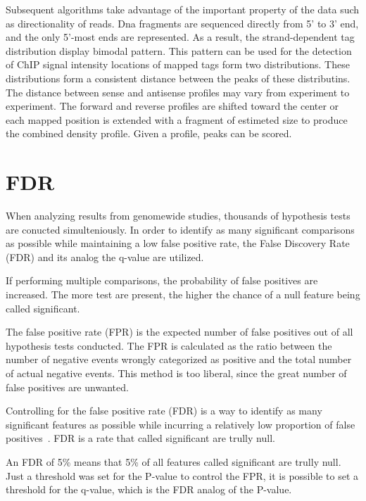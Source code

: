 Subsequent algorithms take advantage of the important property of the data such as directionality of reads.
Dna fragments are sequenced directly from 5' to 3' end, and the only 5'-most ends are represented.
As a result, the strand-dependent tag distribution display bimodal pattern.
This pattern can be used for the detection of ChIP signal intensity locations of mapped tags form two distributions.
These distributions form a consistent distance between the peaks of these distributins.
The distance between sense and antisense profiles may vary from experiment to experiment.
The forward and reverse profiles are shifted toward the center or each mapped position is extended with a fragment of estimeted size to produce the combined density profile.
Given a profile, peaks can be scored.

\section{FDR}

When analyzing results from genomewide studies, thousands of hypothesis tests are conucted simulteniously.
In order to identify as many significant comparisons as possible while maintaining a low false positive rate, the False Discovery Rate (FDR) and its analog the q-value are utilized.

If performing multiple comparisons, the probability of false positives are increased.
The more test are present, the higher the chance of a null feature being called significant.

The false positive rate (FPR) is the expected number of false positives out of all hypothesis tests conducted.
The FPR is calculated as the ratio between the number of negative events wrongly categorized as positive and the total number of actual negative events.
This method is too liberal, since the great number of false positives are unwanted.

Controlling for the false positive rate (FDR) is a way to identify as many significant features as possible while incurring a relatively low proportion of false positives~\cite{benjamini1995controlling}.
FDR is a rate that called significant are trully null.

An FDR of 5\% means that 5\% of all features called significant are trully null.
Just a threshold was set for the P-value to control the FPR, it is possible to set a threshold for the q-value, which is the FDR analog of the P-value.

